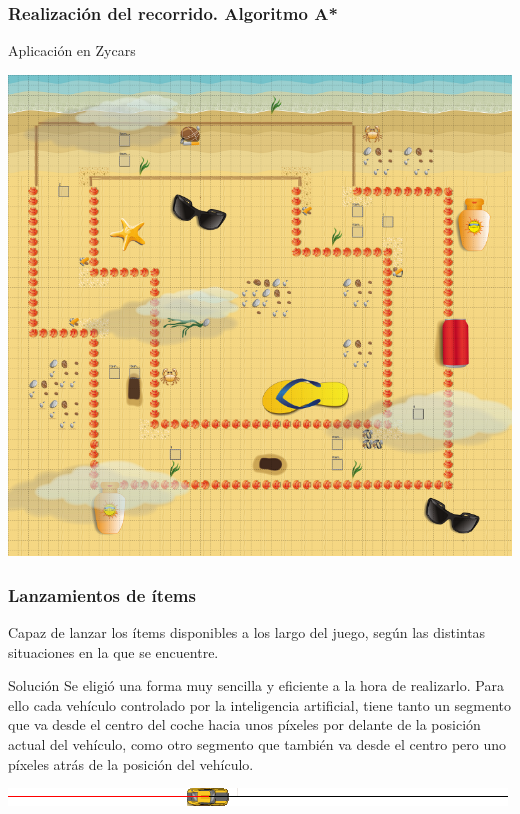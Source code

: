 \begin{frame}
    \frametitle{Realización del recorrido. Algoritmo A*}

        Aplicación en Zycars

        \begin{center}
                \includegraphics[scale=0.3]{imagenes/ia_check.png}
        \end{center}
        
\end{frame}

\begin{frame}
    \frametitle{Lanzamientos de ítems}

    Capaz de lanzar los ítems disponibles a los largo del juego, según las
    distintas situaciones en la que se encuentre.

        \begin{block}{Solución}
        Se eligió una forma muy sencilla y eficiente a la hora de realizarlo. Para ello cada
        vehículo controlado por la inteligencia artificial, tiene tanto un segmento que va desde el centro del
        coche hacia unos píxeles por delante de la posición actual del vehículo, como otro segmento que
        también va desde el centro pero uno píxeles atrás de la posición del vehículo.
        \end{block}

        \begin{center}
                \includegraphics[scale=0.5]{imagenes/ia_segmentos.png}
        \end{center}

\end{frame}
